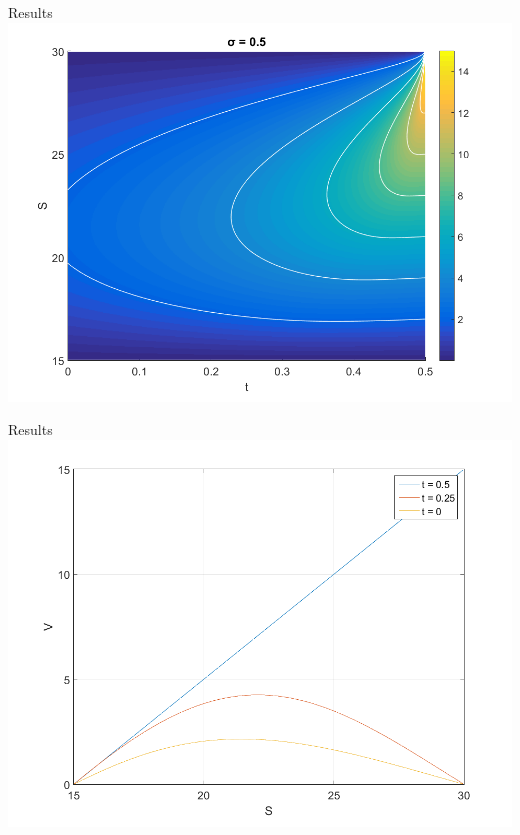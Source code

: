 \documentclass{beamer}
\numberwithin{equation}{section}
\begin{document}
\begin{frame}{Results}
    \centering
      \includegraphics[width=1\textwidth]{../plots/field}
\end{frame}

\begin{frame}{Results}
    \centering
      \includegraphics[width=1\textwidth]{../plots/lines}
\end{frame}
\end{document}
